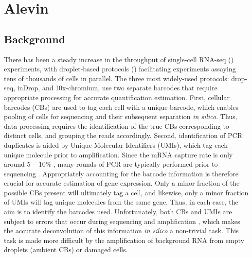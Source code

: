 
\chapter{Alevin} %

\label{alevin} %


\newtheorem{theorem}{Theorem}

\section{Background}
There has been a steady increase in the throughput of single-cell RNA-seq (\scrnaseq) experiments, with droplet-based protocols (\dscrnaseq)\citep{dropseq, indrop, tenx} facilitating experiments assaying tens of thousands of cells in parallel. The three most widely-used \dscrnaseq protocols: drop-seq\citep{dropseq}, inDrop\citep{indrop}, and 10x-chromium\citep{tenx}, use two separate barcodes that require appropriate processing for accurate quantification estimation. First, cellular barcodes (CBs) are used to tag each cell with a unique barcode, which enables pooling of cells for sequencing and their subsequent separation \textit{in silico}. Thus, data processing requires the identification of the true CBs corresponding to distinct cells, and grouping the reads accordingly. 
Second, identification of PCR duplicates is aided by Unique Molecular Identifiers (UMIs), which tag each unique molecule prior to amplification. Since the mRNA capture rate is only around $5-10\%$ \citep{power}, many rounds of PCR are typically performed prior to sequencing \citep{dropseq}.
Appropriately accounting for the barcode information is therefore crucial for accurate estimation of gene expression. Only a minor fraction of the possible CBs present will ultimately tag a cell, and likewise, only a minor fraction of UMIs will tag unique molecules from the same gene. Thus, in each case, the aim is to identify the barcodes used. Unfortunately, both CBs and UMIs are subject to errors that occur during sequencing and amplification \citep{umitools, dropseq}, which makes the accurate deconvolution of this information \textit{in silico} a non-trivial task. This task is made more difficult by the amplification of background RNA from empty droplets (ambient CBs) or damaged cells.



